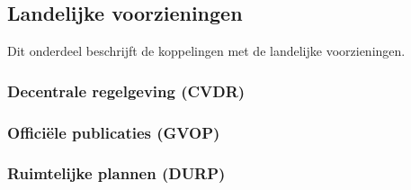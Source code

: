 \subsection{Landelijke voorzieningen}

Dit onderdeel beschrijft de koppelingen met de landelijke voorzieningen.

\subsubsection{Decentrale regelgeving (CVDR)}

\subsubsection{Offici\"{e}le publicaties (GVOP)}

\subsubsection{Ruimtelijke plannen (DURP)}


